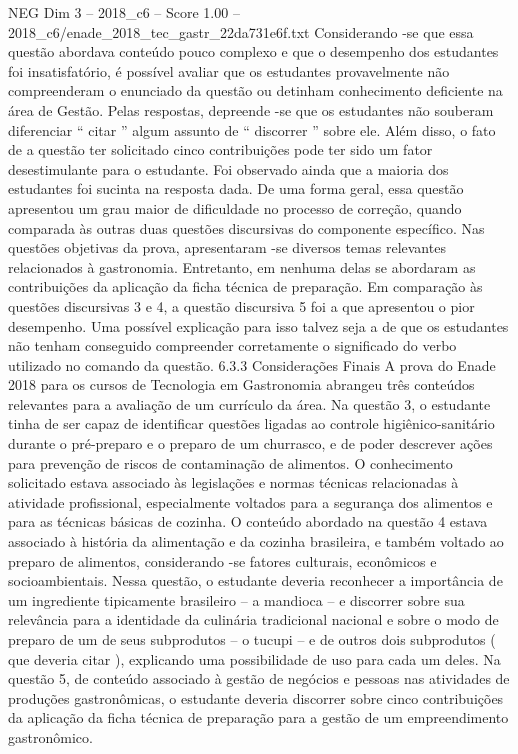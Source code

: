 \begin{textsample}{NEG Dim 3 – 2018\_c6 – Score 1.00 – 2018\_c6/enade\_2018\_tec\_gastr\_22da731e6f.txt}
Considerando -se que essa questão abordava conteúdo pouco complexo e que o desempenho dos estudantes foi insatisfatório, é possível avaliar que os estudantes provavelmente não compreenderam o enunciado da questão ou detinham conhecimento deficiente na área de Gestão.
Pelas respostas, depreende -se que os estudantes não souberam diferenciar “ citar ” algum assunto de “ discorrer ” sobre ele.
Além disso, o fato de a questão ter solicitado cinco contribuições pode ter sido um fator desestimulante para o estudante.
Foi observado ainda que a maioria dos estudantes foi sucinta na resposta dada.
De uma forma geral, essa questão apresentou um grau maior de dificuldade no processo de correção, quando comparada às outras duas questões discursivas do componente específico.
Nas questões objetivas da prova, apresentaram -se diversos temas relevantes relacionados à gastronomia.
Entretanto, em nenhuma delas se abordaram as contribuições da aplicação da ficha técnica de preparação.
Em comparação às questões discursivas 3 e 4, a questão discursiva 5 foi a que apresentou o pior desempenho.
Uma possível explicação para isso talvez seja a de que os estudantes não tenham conseguido compreender corretamente o significado do verbo utilizado no comando da questão. 6.3.3 Considerações Finais A prova do Enade 2018 para os cursos de Tecnologia em Gastronomia abrangeu três conteúdos relevantes para a avaliação de um currículo da área.
Na questão 3, o estudante tinha de ser capaz de identificar questões ligadas ao controle higiênico-sanitário durante o pré-preparo e o preparo de um churrasco, e de poder descrever ações para prevenção de riscos de contaminação de alimentos.
O conhecimento solicitado estava associado às legislações e normas técnicas relacionadas à atividade profissional, especialmente voltados para a segurança dos alimentos e para as técnicas básicas de cozinha.
O conteúdo abordado na questão 4 estava associado à história da alimentação e da cozinha brasileira, e também voltado ao preparo de alimentos, considerando -se fatores culturais, econômicos e socioambientais.
Nessa questão, o estudante deveria reconhecer a importância de um ingrediente tipicamente brasileiro – a mandioca – e discorrer sobre sua relevância para a identidade da culinária tradicional nacional e sobre o modo de preparo de um de seus subprodutos – o tucupi – e de outros dois subprodutos ( que deveria citar ), explicando uma possibilidade de uso para cada um deles.
Na questão 5, de conteúdo associado à gestão de negócios e pessoas nas atividades de produções gastronômicas, o estudante deveria discorrer sobre cinco contribuições da aplicação da ficha técnica de preparação para a gestão de um empreendimento gastronômico.

\end{textsample}
